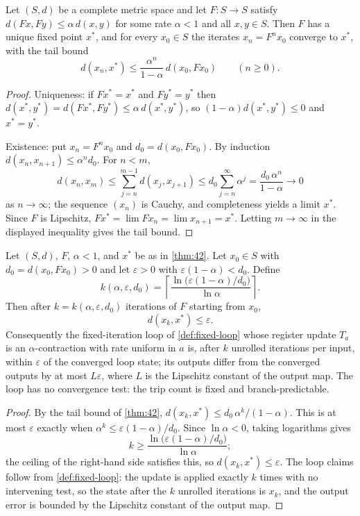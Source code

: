 \begin{theorem}\label{thm:42}
Let $(S,d)$ be a complete metric space and let $F \colon S \to S$ satisfy $d (Fx,Fy) \leq \alpha\,d (x,y)$ for some rate $\alpha < 1$ and all $x,y \in S$. Then $F$ has a unique fixed point $x^{*}$, and for every $x_0 \in S$ the iterates $x_n = F^n x_0$ converge to $x^{*}$, with the tail bound
\[ d (x_n,x^{*}) \leq \frac{\alpha^n}{1-\alpha}\,d (x_0,Fx_0) \qquad (n \geq 0). \]
\end{theorem}

\begin{proof}
Uniqueness: if $Fx^{*} = x^{*}$ and $Fy^{*} = y^{*}$ then $d (x^{*},y^{*}) = d (Fx^{*},Fy^{*}) \leq \alpha\,d (x^{*},y^{*})$, so $(1-\alpha) d (x^{*},y^{*}) \leq 0$ and $x^{*} = y^{*}$.

Existence: put $x_n = F^n x_0$ and $d_0 = d (x_0,Fx_0)$. By induction $d (x_n,x_{n+1}) \leq \alpha^n d_0$. For $n < m$,
\[ d (x_n,x_m) \leq \sum_{j=n}^{m-1} d (x_j,x_{j+1}) \leq d_0 \sum_{j=n}^{\infty} \alpha^{j} = \frac{d_0\,\alpha^n}{1-\alpha} \longrightarrow 0 \]
as $n \to \infty$; the sequence $(x_n)$ is Cauchy, and completeness yields a limit $x^{*}$. Since $F$ is Lipschitz, $Fx^{*} = \lim Fx_n = \lim x_{n+1} = x^{*}$. Letting $m \to \infty$ in the displayed inequality gives the tail bound.
\end{proof}

\begin{theorem}\label{thm:43}
Let $(S,d)$, $F$, $\alpha < 1$, and $x^{*}$ be as in \autoref{thm:42}. Let $x_0 \in S$ with $d_0 = d (x_0,Fx_0) > 0$ and let $\varepsilon > 0$ with $\varepsilon (1-\alpha) < d_0$. Define
\[ k (\alpha,\varepsilon,d_0) = \left\lceil \frac{\ln\bigl (\varepsilon (1-\alpha)/d_0\bigr)}{\ln \alpha} \right\rceil. \]
Then after $k = k (\alpha,\varepsilon,d_0)$ iterations of $F$ starting from $x_0$,
\[ d (x_k,x^{*}) \leq \varepsilon . \]
Consequently the fixed-iteration loop of \autoref{def:fixed-loop} whose register update $T_a$ is an $\alpha$-contraction with rate uniform in $a$ is, after $k$ unrolled iterations per input, within $\varepsilon$ of the converged loop state; its outputs differ from the converged outputs by at most $L\varepsilon$, where $L$ is the Lipschitz constant of the output map. The loop has no convergence test: the trip count is fixed and branch-predictable.
\end{theorem}

\begin{proof}
By the tail bound of \autoref{thm:42}, $d (x_k,x^{*}) \leq d_0\,\alpha^k/(1-\alpha)$. This is at most $\varepsilon$ exactly when $\alpha^k \leq \varepsilon (1-\alpha)/d_0$. Since $\ln \alpha < 0$, taking logarithms gives
\[ k \geq \frac{\ln\bigl (\varepsilon (1-\alpha)/d_0\bigr)}{\ln \alpha}; \]
the ceiling of the right-hand side satisfies this, so $d (x_k,x^{*}) \leq \varepsilon$. The loop claims follow from \autoref{def:fixed-loop}: the update is applied exactly $k$ times with no intervening test, so the state after the $k$ unrolled iterations is $x_k$, and the output error is bounded by the Lipschitz constant of the output map.
\end{proof}

